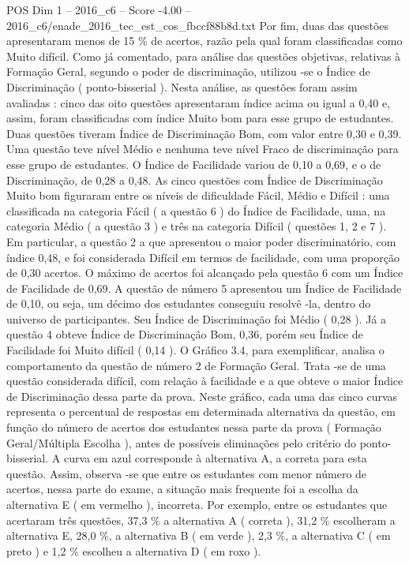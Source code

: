 \begin{textsample}{POS Dim 1 – 2016\_c6 – Score -4.00 – 2016\_c6/enade\_2016\_tec\_est\_cos\_fbccf88b8d.txt}
Por fim, duas das questões apresentaram menos de 15 \% de acertos, razão pela qual foram classificadas como Muito difícil.
Como já comentado, para análise das questões objetivas, relativas à Formação Geral, segundo o poder de discriminação, utilizou -se o Índice de Discriminação ( ponto-bisserial ).
Nesta análise, as questões foram assim avaliadas : cinco das oito questões apresentaram índice acima ou igual a 0,40 e, assim, foram classificadas com índice Muito bom para esse grupo de estudantes.
Duas questões tiveram Índice de Discriminação Bom, com valor entre 0,30 e 0,39.
Uma questão teve nível Médio e nenhuma teve nível Fraco de discriminação para esse grupo de estudantes.
O Índice de Facilidade variou de 0,10 a 0,69, e o de Discriminação, de 0,28 a 0,48.
As cinco questões com Índice de Discriminação Muito bom figuraram entre os níveis de dificuldade Fácil, Médio e Difícil : uma classificada na categoria Fácil ( a questão 6 ) do Índice de Facilidade, uma, na categoria Médio ( a questão 3 ) e três na categoria Difícil ( questões 1, 2 e 7 ).
Em particular, a questão 2 a que apresentou o maior poder discriminatório, com índice 0,48, e foi considerada Difícil em termos de facilidade, com uma proporção de 0,30 acertos.
O máximo de acertos foi alcançado pela questão 6 com um Índice de Facilidade de 0,69.
A questão de número 5 apresentou um Índice de Facilidade de 0,10, ou seja, um décimo dos estudantes conseguiu resolvê -la, dentro do universo de participantes.
Seu Índice de Discriminação foi Médio ( 0,28 ).
Já a questão 4 obteve Índice de Discriminação Bom, 0,36, porém seu Índice de Facilidade foi Muito difícil ( 0,14 ).
O Gráfico 3.4, para exemplificar, analisa o comportamento da questão de número 2 de Formação Geral.
Trata -se de uma questão considerada difícil, com relação à facilidade e a que obteve o maior Índice de Discriminação dessa parte da prova.
Neste gráfico, cada uma das cinco curvas representa o percentual de respostas em determinada alternativa da questão, em função do número de acertos dos estudantes nessa parte da prova ( Formação Geral/Múltipla Escolha ), antes de possíveis eliminações pelo critério do ponto-bisserial.
A curva em azul corresponde à alternativa A, a correta para esta questão.
Assim, observa -se que entre os estudantes com menor número de acertos, nessa parte do exame, a situação mais frequente foi a escolha da alternativa E ( em vermelho ), incorreta.
Por exemplo, entre os estudantes que acertaram três questões, 37,3 \% a alternativa A ( correta ), 31,2 \% escolheram a alternativa E, 28,0 \%, a alternativa B ( em verde ), 2,3 \%, a alternativa C ( em preto ) e 1,2 \% escolheu a alternativa D ( em roxo ).

\end{textsample}
